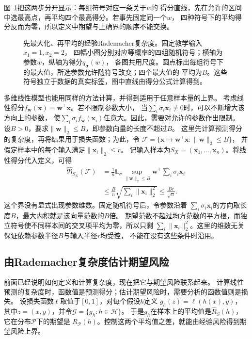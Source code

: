 图~\ref{fig:learning-rademacher-selection}把这两步分开显示：每组符号对应一条关于$w$的
得分直线，先在允许的区间中选最高点，再平均四个最高得分。若事先固定同一个$w$，
四种符号下的平均得分反而为零，所以定义中期望与上确界的顺序不能交换。

\begin{figure}[!htb]
 \centering
 
 \caption{先最大化、再平均的经验Rademacher复杂度。固定教学输入$x_1=1,x_2=2$，
 四幅小图分别对应等概率的四组随机符号；横轴为参数$w$，纵轴为得分$q_{\bm\sigma}(w)$，
 各图共用尺度。圆点标出每组符号下的最大值，所选参数允许随符号改变；四个最大值的
 平均为$B$。这些符号独立于数据的真实标签，图中直线由得分公式计算得到。}
 \label{fig:learning-rademacher-selection}
\end{figure}

多维线性模型也能用同样的方法计算，并得到适用于任意样本量的上界。
考虑线性得分$f_{\bm w}(\bm x)=\bm w^\top\bm x$。若不限制参数大小，
当$\sum_i\sigma_i\bm x_i\neq0$时，可以不断增大该方向上的参数，
使$\sum_i\sigma_i f_{\bm w}(\bm x_i)$任意大。因此，需要对允许的参数作出限制。
设$B>0$，要求$\|\bm w\|_2\leq B$，即参数向量的长度不超过$B$。
这里先计算预测得分的复杂度，再将结果用于损失函数；为此，令
$\mathcal F=\{\bm{x}\mapsto \bm{w}^\top \bm{x}:\lVert\bm{w}\rVert_2\leq B\}$，
并假定样本中的每个输入满足$\lVert\bm{x}_i\rVert_2\leq r$。
记输入样本为$S_X=(\bm x_1,\ldots,\bm x_n)$。将线性得分代入定义，可得
\begin{align}
 \widehat{\mathfrak R}_{S_X}(\mathcal F)
 &=\frac1n\mathbb E_\sigma\sup_{\lVert\bm{w}\rVert_2\leq B}
   \bm{w}^\top\sum_i\sigma_i \bm{x}_i\nonumber\\
 &\leq\frac{B}{n}\sqrt{\sum_i\lVert\bm{x}_i\rVert_2^2}
 \leq\frac{Br}{\sqrt n}.
 \label{eq:linear-rademacher-bound}
\end{align}
这个界没有显式出现参数维数。固定随机符号后，令参数沿着
$\sum_i\sigma_i\bm x_i$的方向取长度$B$，最大内积就是该向量范数的$B$倍。
期望范数不超过均方范数的平方根，而独立符号使不同样本间的交叉项平均为零，所以只剩
$\sum_i\lVert\bm x_i\rVert_2^2$。这里的维数无关保证依赖参数半径$B$与输入半径$r$均受控，
不能在没有这些条件时沿用。

\subsection{由Rademacher复杂度估计期望风险}

前面已经说明如何定义和计算复杂度，现在把它与期望风险联系起来。
计算线性预测的复杂度时，函数值是预测得分；估计期望风险时，需要分析的函数值则是损失。
设损失函数$\ell$取值于$[0,1]$，对每个假设$h$定义
$g_h(z)=\ell(h(x),y)$，其中$z=(x,y)$，并令$\mathcal G=\{g_h:h\in\mathcal H\}$。
于是$g_h$在样本上的平均值是$\hat R_S(h)$，它在分布$\mathcal P$下的期望是
$R_{\mathcal P}(h)$。控制这两个平均值之差，就能由经验风险得到期望风险上界。

